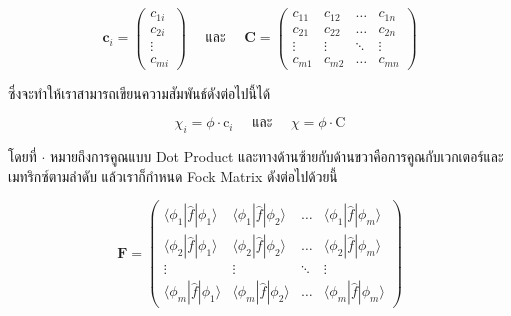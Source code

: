 \begin{equation}
    \mathbf{c}_i
    = \left(
    \begin{array}{c}
            c_{1 i} \\
            c_{2 i} \\
            \vdots  \\
            c_{m i}
        \end{array}
    \right)
    \quad \text{ และ } \quad
    \mathbf{C}
    = \left(
    \begin{array}{cccc}
            c_{11}  & c_{12}  & \ldots & c_{1 n} \\
            c_{21}  & c_{22}  & \ldots & c_{2 n} \\
            \vdots  & \vdots  & \ddots & \vdots  \\
            c_{m 1} & c_{m 2} & \ldots & c_{m n}
        \end{array}
    \right)
\end{equation}

\noindent ซึ่งจะทำให้เราสามารถเขียนความสัมพันธ์ดังต่อไปนี้ได้

\begin{equation}
    \chi_i = \phi \cdot \mathrm{c}_i
    \quad \text{ และ } \quad
    \chi = \phi \cdot \mathrm{C}
\end{equation}

\noindent โดยที่ $\cdot$ หมายถึงการคูณแบบ Dot Product และทางด้านซ้ายกับด้านขวาคือการคูณกับเวกเตอร์และเมทริกซ์ตามลำดับ
แล้วเราก็กำหนด Fock Matrix ดังต่อไปด้วยนี้

\begin{equation}
    \mathbf{F}
    = \left(
    \begin{array}{cccc}
            \langle\phi_1|\hat{f}| \phi_1\rangle & \langle\phi_1|\hat{f}| \phi_2\rangle &
            \ldots                               & \langle\phi_1|\hat{f}| \phi_m\rangle                   \\
            \langle\phi_2|\hat{f}| \phi_1\rangle & \langle\phi_2|\hat{f}| \phi_2\rangle &
            \ldots                               & \langle\phi_2|\hat{f}| \phi_m\rangle                   \\
            \vdots                               & \vdots                               & \ddots & \vdots \\
            \langle\phi_m|\hat{f}| \phi_1\rangle & \langle\phi_m|\hat{f}| \phi_2\rangle &
            \ldots                               & \langle\phi_m|\hat{f}| \phi_m\rangle
        \end{array}
    \right)
\end{equation}

